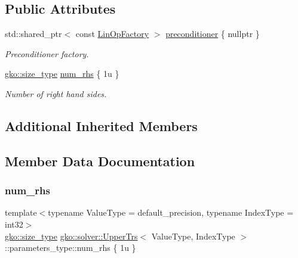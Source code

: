 \subsection*{Public Attributes}
\begin{DoxyCompactItemize}
\item 
\mbox{\label{structgko_1_1solver_1_1UpperTrs_1_1parameters__type_abafbe2000ab58dd5d4af02870e238baa}} 
std\+::shared\+\_\+ptr$<$ const \hyperlink{classgko_1_1LinOpFactory}{Lin\+Op\+Factory} $>$ \hyperlink{structgko_1_1solver_1_1UpperTrs_1_1parameters__type_abafbe2000ab58dd5d4af02870e238baa}{preconditioner} \{ nullptr \}
\begin{DoxyCompactList}\small\item\em Preconditioner factory. \end{DoxyCompactList}\item 
\hyperlink{namespacegko_a6e5c95df0ae4e47aab2f604a22d98ee7}{gko\+::size\+\_\+type} \hyperlink{structgko_1_1solver_1_1UpperTrs_1_1parameters__type_a17d51d403340309c592e593020c3c007}{num\+\_\+rhs} \{ 1u \}
\begin{DoxyCompactList}\small\item\em Number of right hand sides. \end{DoxyCompactList}\end{DoxyCompactItemize}
\subsection*{Additional Inherited Members}


\subsection{Member Data Documentation}
\mbox{\label{structgko_1_1solver_1_1UpperTrs_1_1parameters__type_a17d51d403340309c592e593020c3c007}} 
\subsubsection{\texorpdfstring{num\+\_\+rhs}{num\_rhs}}
{\footnotesize\ttfamily template$<$typename Value\+Type  = default\+\_\+precision, typename Index\+Type  = int32$>$ \\
\hyperlink{namespacegko_a6e5c95df0ae4e47aab2f604a22d98ee7}{gko\+::size\+\_\+type} \hyperlink{classgko_1_1solver_1_1UpperTrs}{gko\+::solver\+::\+Upper\+Trs}$<$ Value\+Type, Index\+Type $>$\+::parameters\+\_\+type\+::num\+\_\+rhs \{ 1u \}\hspace{0.3cm}{\ttfamily [mutable]}}



